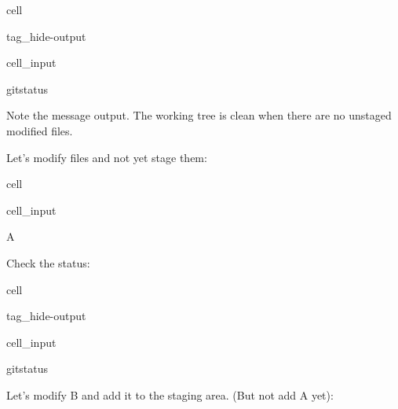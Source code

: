 \documentclass[a4paper,10pt,english]{jupyterBook}
\begin{document}
\begin{sphinxuseclass}{cell}
\begin{sphinxuseclass}{tag_hide-output}\begin{sphinxVerbatimInput}

\begin{sphinxuseclass}{cell_input}
\begin{sphinxVerbatim}[commandchars=\\\{\}]
gitstatus
\end{sphinxVerbatim}

\end{sphinxuseclass}\end{sphinxVerbatimInput}

\end{sphinxuseclass}
\end{sphinxuseclass}
\sphinxAtStartPar
Note the  message output. The working tree is clean when there are no unstaged modified files.

\sphinxAtStartPar
Let’s modify files and not yet stage them:

\begin{sphinxuseclass}{cell}\begin{sphinxVerbatimInput}

\begin{sphinxuseclass}{cell_input}
\begin{sphinxVerbatim}[commandchars=\\\{\}]
\PYGZgt{}\PYGZgt{}A
\end{sphinxVerbatim}

\end{sphinxuseclass}\end{sphinxVerbatimInput}

\end{sphinxuseclass}
\sphinxAtStartPar
Check the status:

\begin{sphinxuseclass}{cell}
\begin{sphinxuseclass}{tag_hide-output}\begin{sphinxVerbatimInput}

\begin{sphinxuseclass}{cell_input}
\begin{sphinxVerbatim}[commandchars=\\\{\}]
gitstatus
\end{sphinxVerbatim}

\end{sphinxuseclass}\end{sphinxVerbatimInput}

\end{sphinxuseclass}
\end{sphinxuseclass}
\sphinxAtStartPar
Let’s modify B and add it to the staging area. (But not add A yet):
\end{document}

